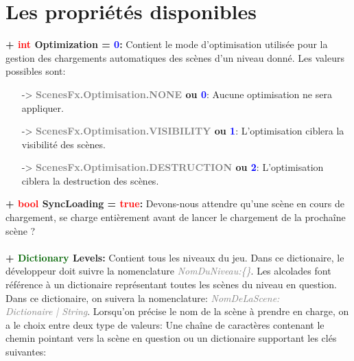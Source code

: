 \documentclass[a4paper, 11pt]{article}
\begin{document}
	\section{Les propriétés disponibles}
	\textbf{+ \textcolor{red}{int} Optimization = \textcolor{blue}{0}:} Contient le mode d'optimisation 
	utilisée pour la gestion des chargements automatiques des scènes d'un niveau donné. Les valeurs 
	possibles sont:
	\begin{itemize}
		\item [-> \textbf{\textcolor{gray}{ScenesFx.Optimisation.NONE} ou \textcolor{blue}{0}}:] Aucune 
		optimisation ne sera appliquer.
		\item [-> \textbf{\textcolor{gray}{ScenesFx.Optimisation.VISIBILITY} ou \textcolor{blue}{1}}:] 
		L'optimisation ciblera la visibilité des scènes.
		\item [-> \textbf{\textcolor{gray}{ScenesFx.Optimisation.DESTRUCTION} ou \textcolor{blue}{2}}:] 
		L'optimisation ciblera la destruction des scènes.\\
	\end{itemize}
	\textbf{+ \textcolor{red}{bool} SyncLoading = \textcolor{red}{true}:} Devons-nous attendre qu'une scène 
	en cours de chargement, se charge entièrement avant de lancer le chargement de la prochaîne scène ?\\\\
	\textbf{+ \textcolor{darkgreen}{Dictionary} Levels:} Contient tous les niveaux du jeu. Dans ce 
	dictionaire, le développeur doit suivre la nomenclature \textit{\textcolor{gray}{NomDuNiveau:\{\}}}. Les 
	alcolades font référence à un dictionaire représentant toutes les scènes du niveau en question. Dans ce
	dictionaire, on suivera la nomenclature: \textit{\textcolor{gray}{NomDeLaScene:\\Dictionaire | String}}.
	Lorsqu'on précise le nom de la scène à prendre en charge, on a le choix entre deux type de valeurs: Une
	chaîne de caractères contenant le chemin pointant vers la scène en question ou un dictionaire supportant
	les clés suivantes:\\
\end{document}
